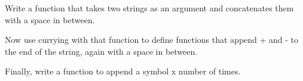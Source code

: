 \documentclass[10pt]{book}
\begin{document}
% 
% 
% 
% 
% 
% 
\begin{ex}
Write a function that takes two strings as an argument and concatenates
them with a space in between.

Now use currying with that function to define functions that append + and - 
to the end of the string, again with a space in between.

Finally, write a function to append a symbol x number of times.

\end{ex}

% 
% 
% 
% 
% 
% 
% 
\end{document}
